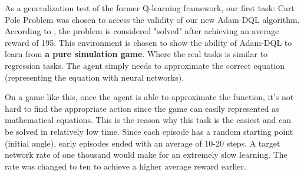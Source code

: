         As a generalization test of the former Q-learning framework, our first task: Cart Pole Problem
        was chosen to access the validity of our new Adam-DQL algorithm. According to \cite{bartosutton}, the problem is considered "solved" after achieving an average reward of 195. This environment is chosen to show the ability of Adam-DQL to learn from \textbf{a pure simulation game}. Where the real tasks is similar to regression tasks. The agent simply needs to approximate the correct equation (representing the equation with neural networks).
        \par 
        On a game like this, once the agent is able to approximate the function, it's not hard to find the appropriate action since the game can easily represented as mathematical equations. This is the reason why this task is the easiest and can be solved in relatively low time. Since each episode has a random
        starting point (initial angle), early episodes ended with an average of 10-20 steps. A target network
        rate of one thousand would make for an extremely slow learning. The rate was changed to ten to
        achieve a higher average reward earlier.
        
